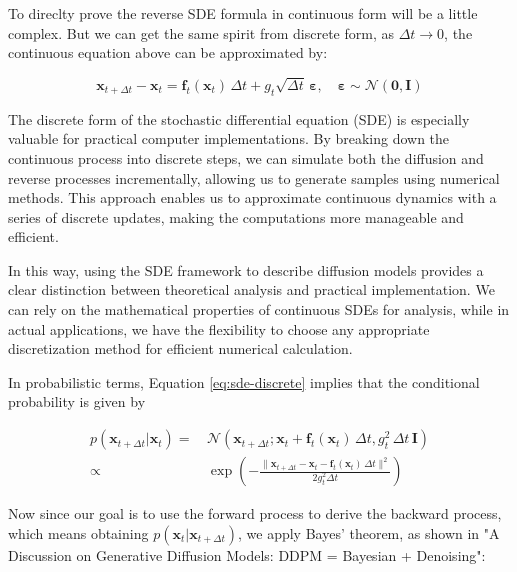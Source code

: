 To direclty prove the reverse SDE formula in continuous form will be a little complex. But we can get the same spirit from discrete form, as \( \Delta t \to 0 \), the continuous equation above can be approximated by:

\begin{equation}
\mathbf{x}_{t+\Delta t} - \mathbf{x}_t = \mathbf{f}_t(\mathbf{x}_t) \, \Delta t + g_t \sqrt{\Delta t} \, \mathbf{\varepsilon}, \quad \mathbf{\varepsilon} \sim \mathcal{N}(\mathbf{0}, \mathbf{I}) \label{eq:sde-discrete}
\end{equation}

The discrete form of the stochastic differential equation (SDE) is especially valuable for practical computer implementations. By breaking down the continuous process into discrete steps, we can simulate both the diffusion and reverse processes incrementally, allowing us to generate samples using numerical methods. This approach enables us to approximate continuous dynamics with a series of discrete updates, making the computations more manageable and efficient.

In this way, using the SDE framework to describe diffusion models provides a clear distinction between theoretical analysis and practical implementation. We can rely on the mathematical properties of continuous SDEs for analysis, while in actual applications, we have the flexibility to choose any appropriate discretization method for efficient numerical calculation.

In probabilistic terms, Equation \eqref{eq:sde-discrete} implies that the conditional probability is given by

\begin{equation}
\begin{aligned}
p(\mathbf{x}_{t+\Delta t}|\mathbf{x}_t) =&\, \mathcal{N}\left(\mathbf{x}_{t+\Delta t}; \mathbf{x}_t + \mathbf{f}_t(\mathbf{x}_t) \, \Delta t, g_t^2 \, \Delta t \, \mathbf{I}\right) \\
\propto&\, \exp\left(-\frac{\|\mathbf{x}_{t+\Delta t} - \mathbf{x}_t - \mathbf{f}_t(\mathbf{x}_t) \, \Delta t\|^2}{2 g_t^2 \Delta t}\right)
\end{aligned} \label{eq:sde-proba}
\end{equation}

Now since our goal is to use the forward process to derive the backward process, which means obtaining \( p(\mathbf{x}_t|\mathbf{x}_{t+\Delta t}) \), we apply Bayes' theorem, as shown in "A Discussion on Generative Diffusion Models: DDPM = Bayesian + Denoising":

